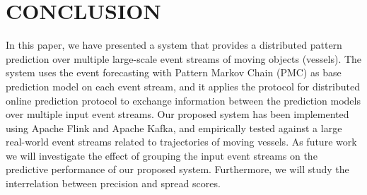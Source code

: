 
\section{CONCLUSION}
\label{sec:concl}
In this paper, we have presented a system that provides  a distributed pattern prediction over multiple large-scale event streams of moving objects (vessels). The system uses the event forecasting with Pattern Markov Chain (PMC) \cite{alevizos2017event} as base prediction model on each event stream, and it applies the protocol for distributed online prediction \cite{kamp2014communication} protocol to exchange information between the prediction models over multiple input event streams.  Our proposed system has been implemented using Apache Flink and Apache Kafka, and empirically tested against a large real-world event streams related to trajectories of moving vessels. As future work we will investigate the effect of grouping the input event streams on the predictive performance of our proposed system. Furthermore,  we will study the interrelation between precision and spread scores.